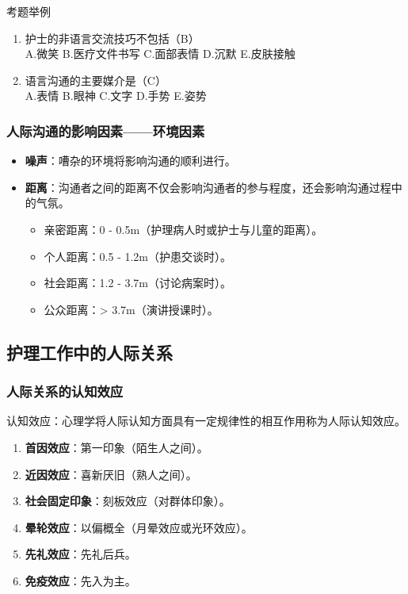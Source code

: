 \documentclass[11pt, a4paper]{ctexart}
\begin{document}
\begin{examplebox}{考题举例}
\begin{enumerate}
    \item 护士的非语言交流技巧不包括（B）\\
    A.微笑 \quad B.医疗文件书写 \quad C.面部表情 \quad D.沉默 \quad E.皮肤接触
    \item 语言沟通的主要媒介是（C）\\
    A.表情 \quad B.眼神 \quad C.文字 \quad D.手势 \quad E.姿势
\end{enumerate}
\end{examplebox}

\subsubsection{人际沟通的影响因素——环境因素}
\begin{itemize}
    \item \textbf{噪声}：嘈杂的环境将影响沟通的顺利进行。
    \item \textbf{距离}：沟通者之间的距离不仅会影响沟通者的参与程度，还会影响沟通过程中的气氛。
    \begin{itemize}
        \item 亲密距离：0 - 0.5m（护理病人时或护士与儿童的距离）。
        \item 个人距离：0.5 - 1.2m（护患交谈时）。
        \item 社会距离：1.2 - 3.7m（讨论病案时）。
        \item 公众距离：> 3.7m（演讲授课时）。
    \end{itemize}
\end{itemize}

\subsection{护理工作中的人际关系}
\subsubsection{人际关系的认知效应}
认知效应：心理学将人际认知方面具有一定规律性的相互作用称为人际认知效应。
\begin{enumerate}
    \item \textbf{首因效应}：第一印象（陌生人之间）。
    \item \textbf{近因效应}：喜新厌旧（熟人之间）。
    \item \textbf{社会固定印象}：刻板效应（对群体印象）。
    \item \textbf{晕轮效应}：以偏概全（月晕效应或光环效应）。
    \item \textbf{先礼效应}：先礼后兵。
    \item \textbf{免疫效应}：先入为主。
\end{enumerate}
\end{document}
